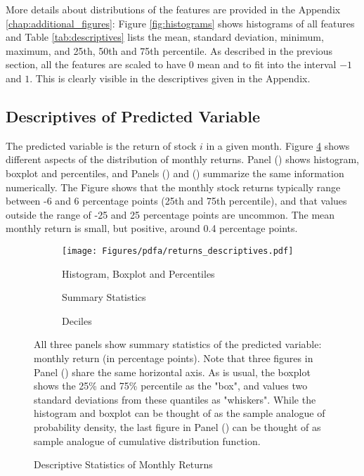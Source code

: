 		More details about distributions of the features are provided in the Appendix \ref{chap:additional_figures}: Figure \ref{fig:histograms} shows histograms of all features and Table \ref{tab:descriptives} lists the mean, standard deviation, minimum, maximum, and 25th, 50th and 75th percentile. As described in the previous section, all the features are scaled to have 0 mean and to fit into the interval $-1$ and $1$. This is clearly visible in the descriptives given in the Appendix. 
		
	\subsection{Descriptives of Predicted Variable}
		The predicted variable is the return of stock $i$ in a given month. Figure \ref{fig:return_descriptives} shows different aspects of the distribution of monthly returns. Panel () shows histogram, boxplot and percentiles, and Panels 	() and () summarize the same information numerically.  The Figure shows that the monthly stock returns typically range between -6 and 6 percentage points (25th and 75th percentile), and that values outside the range of -25 and 25 percentage points are uncommon. The mean monthly return is small, but positive, around 0.4 percentage points. 
		
		\begin{figure}	
			\centering		
			\begin{subfigure}[t]{\textwidth}
				\texttt{[image: Figures/pdfa/returns\_descriptives.pdf]}
				\caption{Histogram, Boxplot and Percentiles}
				\label{fig:returns_descriptives_plot}
			\end{subfigure}
		
			\bigskip
			\begin{subfigure}[t]{\textwidth}
				\centering
				
				\caption{Summary Statistics}
				\label{fig:return_descriptives_table}
			\end{subfigure}
			
			\bigskip
			\begin{subfigure}[t]{\textwidth}
				\centering
				
				\caption{Deciles}
				\label{fig:return_deciles_table}
			\end{subfigure}
		
			\caption{Descriptive Statistics of Monthly Returns}
			\label{fig:return_descriptives}
			\medskip
			\small
			All three panels show summary statistics of the predicted variable: monthly return (in percentage points). Note that three figures in Panel () share the same horizontal axis. As is usual, the boxplot shows the 25\% and 75\% percentile as the "box", and values two standard deviations from these quantiles as "whiskers". While the histogram and boxplot can be thought of as the sample analogue of probability density, the last figure in Panel () can be thought of as sample analogue of cumulative distribution function. 
		\end{figure}

